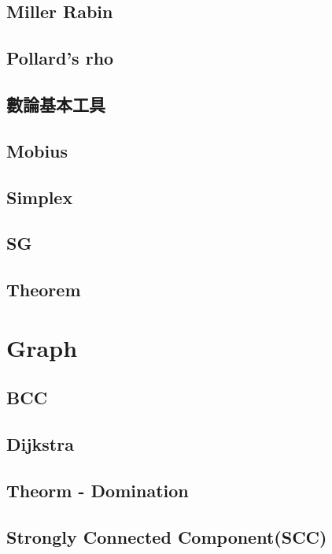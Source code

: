 \subsection{Miller Rabin}

\subsection{Pollard's rho}

\subsection{數論基本工具}

\subsection{Mobius}

\subsection{Simplex}

\subsection{SG}

\subsection{Theorem}



\section{Graph}

\subsection{BCC}

\subsection{Dijkstra}

\subsection{Theorm - Domination}

\subsection{Strongly Connected Component(SCC)}
